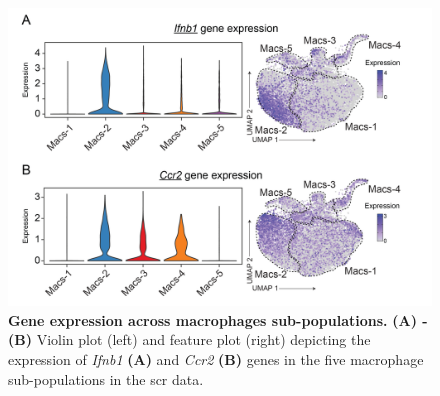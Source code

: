 \begin{figure}[H]
    \centering
    \includegraphics[width=12cm]{Appendix2/Fig/F2-A7-01.png}
    \caption[Gene expression across macrophages sub-populations]{\textbf{Gene expression across macrophages sub-populations.} \textbf{(A) - (B)} Violin plot (left) and feature plot (right) depicting the expression of \textit{Ifnb1} \textbf{(A)} and \textit{Ccr2} \textbf{(B)} genes in the five macrophage sub-populations in the \gls{scr} data.}
    \label{fig:app_scrna_macrophages_macs2_genes}
\end{figure}


\vspace{-22pt}


